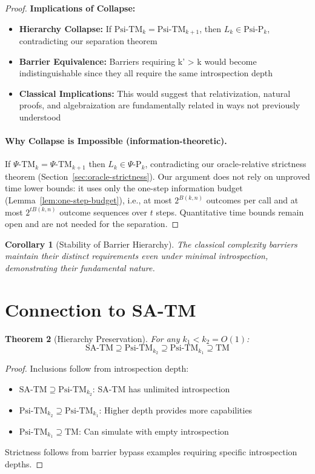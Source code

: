 \documentclass[11pt]{article}
\newtheorem{theorem}{Theorem}[section]
\newtheorem{corollary}[theorem]{Corollary}
\theoremstyle{plain}
\theoremstyle{definition}
\begin{document}
\begin{proof}
\textbf{Implications of Collapse:}
\begin{itemize}
\item \textbf{Hierarchy Collapse:} If $\text{Psi-TM}_k = \text{Psi-TM}_{k+1}$, then $L_k \in \text{Psi-P}_k$, contradicting our separation theorem
\item \textbf{Barrier Equivalence:} Barriers requiring k' > k would become indistinguishable since they all require the same introspection depth
\item \textbf{Classical Implications:} This would suggest that relativization, natural proofs, and algebraization are fundamentally related in ways not previously understood
\end{itemize}

\paragraph{Why Collapse is Impossible (information-theoretic).}
If $\Psi\text{-TM}_k=\Psi\text{-TM}_{k+1}$ then $L_k\in\Psi\text{-P}_k$, contradicting our
oracle-relative strictness theorem (Section~\ref{sec:oracle-strictness}). Our argument
does not rely on unproved time lower bounds: it uses only the one-step information
budget (Lemma~\ref{lem:one-step-budget}), i.e., at most $2^{B(k,n)}$ outcomes per call
and at most $2^{t B(k,n)}$ outcome sequences over $t$ steps. Quantitative time bounds
remain open and are not needed for the separation.
\end{proof}

\begin{corollary}[Stability of Barrier Hierarchy]
The classical complexity barriers maintain their distinct requirements even under minimal introspection, demonstrating their fundamental nature.
\end{corollary}

\section{Connection to SA-TM}

\begin{theorem}[Hierarchy Preservation]
For any $k_1 < k_2 = O(1)$:
$$\text{SA-TM} \supseteq \text{Psi-TM}_{k_2} \supseteq \text{Psi-TM}_{k_1} \supseteq \text{TM}$$
\end{theorem}

\begin{proof}
Inclusions follow from introspection depth:
\begin{itemize}
\item $\text{SA-TM} \supseteq \text{Psi-TM}_{k_2}$: SA-TM has unlimited introspection
\item $\text{Psi-TM}_{k_2} \supseteq \text{Psi-TM}_{k_1}$: Higher depth provides more capabilities  
\item $\text{Psi-TM}_{k_1} \supseteq \text{TM}$: Can simulate with empty introspection
\end{itemize}
Strictness follows from barrier bypass examples requiring specific introspection depths.
\end{proof}
\end{document}
